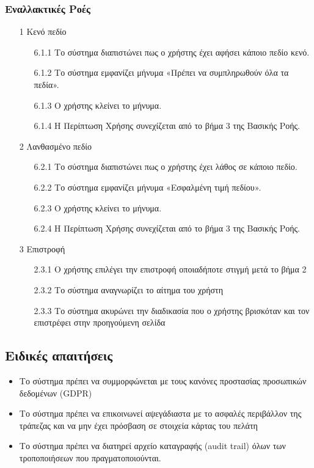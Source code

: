 \documentclass[12pt,a4paper,twoside]{book}
\begin{document}
\subsubsection{Εναλλακτικές Ροές}
\begin{enumerate}
  \item[1 ] Κενό πεδίο  %
        \begin{enumerate}
          \item[6.1.1 ] Το σύστημα διαπιστώνει πως ο χρήστης έχει αφήσει κάποιο πεδίο κενό. %
          \item[6.1.2 ] Το σύστημα εμφανίζει μήνυμα «Πρέπει να συμπληρωθούν όλα τα πεδία». %
          \item[6.1.3 ] Ο χρήστης κλείνει το μήνυμα. %
          \item[6.1.4 ] Η Περίπτωση Χρήσης συνεχίζεται από το βήμα 3 της Βασικής Ροής. %
        \end{enumerate}
  \item[2 ] Λανθασμένο πεδίο %
        \begin{enumerate}
          \item[6.2.1 ] Το σύστημα διαπιστώνει πως ο χρήστης έχει λάθος σε κάποιο πεδίο.%
          \item[6.2.2 ] Το σύστημα εμφανίζει μήνυμα «Εσφαλμένη τιμή πεδίου».  %
          \item[6.2.3 ] Ο χρήστης κλείνει το μήνυμα.%
          \item[6.2.4 ] Η Περίπτωση Χρήσης συνεχίζεται από το βήμα 3 της Βασικής Ροής. %
        \end{enumerate}
  \item[3 ] Επιστροφή
        \begin{enumerate}
          \item[2.3.1 ] Ο χρήστης επιλέγει την επιστροφή οποιαδήποτε στιγμή μετά το βήμα 2 %
          \item[2.3.2 ] Το σύστημα αναγνωρίζει το αίτημα του χρήστη %
          \item[2.3.3 ] Το σύστημα ακυρώνει την διαδικασία που ο χρήστης βρισκόταν και τον επιστρέφει στην προηγούμενη σελίδα %
        \end{enumerate}
\end{enumerate}

\subsection{Ειδικές απαιτήσεις} %
\begin{itemize}
  \item Το σύστημα πρέπει να συμμορφώνεται με τους κανόνες προστασίας προσωπικών δεδομένων (GDPR)  %
  \item Το σύστημα πρέπει να επικοινωνεί αψεγάδιαστα με το ασφαλές περιβάλλον της τράπεζας και να μην έχει πρόσβαση σε στοιχεία κάρτας του πελάτη   %
  \item Το σύστημα πρέπει να διατηρεί αρχείο καταγραφής (audit trail) όλων των τροποποιήσεων που πραγματοποιούνται. %
\end{itemize}
\end{document}

